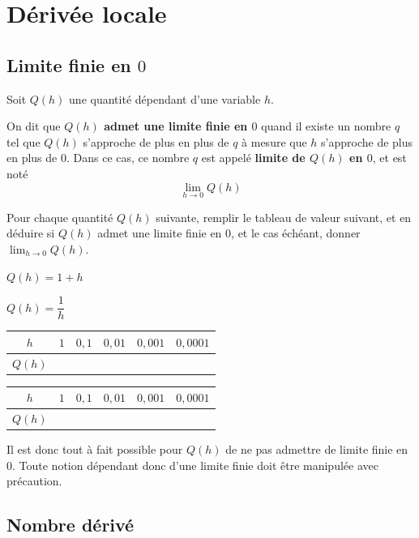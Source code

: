 \documentclass{poly}
\begin{document}
\section{Dérivée locale}
\subsection{Limite finie en $0$}
Soit $Q(h)$ une quantité dépendant d'une variable $h$.
\begin{definition}
On dit que \textbf{$Q(h)$ admet une limite finie en $0$} quand il existe un nombre $q$ tel que $Q(h)$ s'approche de plus en plus de $q$ à mesure que $h$ s'approche de plus en plus de $0$. Dans ce cas, ce nombre $q$ est appelé \textbf{limite de $Q(h)$ en $0$}, et est noté
\begin{equation*}
\lim_{h \to 0} Q(h)
\end{equation*}
\end{definition}
\begin{example}
Pour chaque quantité $Q(h)$ suivante, remplir le tableau de valeur suivant, et en déduire si $Q(h)$ admet une limite finie en $0$, et le cas échéant, donner $\lim_{h \to 0} Q(h)$.
\begin{alphaquestions}
\item $Q(h) = 1 + h$
\item $Q(h) = \dfrac{1}{h}$
\end{alphaquestions}
\begin{center}
\hfill
\begin{tabular}{|c|p{0.9cm}|p{0.9cm}|p{0.9cm}|p{0.9cm}|p{0.9cm}|}
\hline
$h$ & $1$ & $0,1$ & $0,01$ & $0,001$ & $0,0001$\\
\hline
$Q(h)$ &  &  &  &  & \\
\hline
\end{tabular}
\hfill
\begin{tabular}{|c|p{0.9cm}|p{0.9cm}|p{0.9cm}|p{0.9cm}|p{0.9cm}|}
\hline
$h$ & $1$ & $0,1$ & $0,01$ & $0,001$ & $0,0001$\\
\hline
$Q(h)$ &  &  &  &  & \\
\hline
\end{tabular}
\hfill
\end{center}
\end{example}
\begin{remark}
Il est donc tout à fait possible pour $Q(h)$ de ne pas admettre de limite finie en $0$. Toute notion dépendant donc d'une limite finie doit être manipulée avec précaution.
\end{remark}
\subsection{Nombre dérivé}
\end{document}
